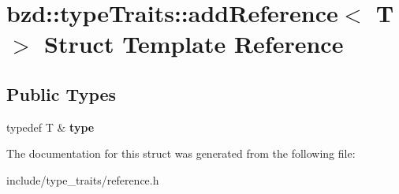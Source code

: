 \hypertarget{structbzd_1_1typeTraits_1_1addReference}{}\section{bzd\+:\+:type\+Traits\+:\+:add\+Reference$<$ T $>$ Struct Template Reference}
\label{structbzd_1_1typeTraits_1_1addReference}
\subsection*{Public Types}
\begin{DoxyCompactItemize}
\item 
\mbox{\label{structbzd_1_1typeTraits_1_1addReference_af88c2ac5594c77cfd41968d34314645a}} 
typedef T \& {\bfseries type}
\end{DoxyCompactItemize}


The documentation for this struct was generated from the following file\+:\begin{DoxyCompactItemize}
\item 
include/type\+\_\+traits/reference.\+h\end{DoxyCompactItemize}
